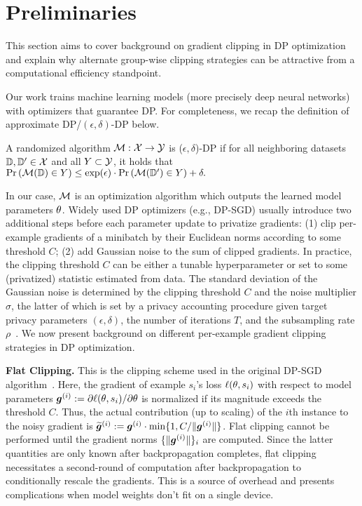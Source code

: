 \section{Preliminaries} \label{sec:preliminary}
This section aims to cover background on gradient clipping in DP optimization and explain why alternate group-wise clipping strategies can be attractive from a computational efficiency standpoint.

Our work trains machine learning models (more precisely deep neural networks) with optimizers that guarantee DP. 
For completeness, we recap the definition of approximate DP/$(\epsilon, \delta)$-DP below.
\begin{defi}
A randomized algorithm $\mathcal{M}: \mathcal{X} \to \mathcal{Y}$ is ($\epsilon, \delta$)-DP if for all neighboring datasets $\mathbb{D}, \mathbb{D}'\in \mathcal{X}$ and all $Y \subset \mathcal{Y}$, it holds that 
$
\mathrm{Pr}\left(\mathcal{M}(\mathbb{D}) \in Y\right) \le 
\exp( \epsilon ) \cdot \mathrm{Pr}\left( \mathcal{M}(\mathbb{D}') \in Y \right) + \delta.
\label{eq:epsilon_delta_dp}
$
\end{defi}
In our case, $\mathcal{M}$ is an optimization algorithm which outputs the learned model parameters $\mathbf{\theta}$. 
Widely used DP optimizers (e.g., DP-SGD) usually introduce two additional steps before each parameter update to privatize gradients:
(1) clip per-example gradients of a minibatch by their Euclidean norms according to some threshold $C$;
(2) add Gaussian noise to the sum of clipped gradients. 
In practice, the clipping threshold $C$ can be either a tunable hyperparameter or set to some (privatized) statistic estimated from data. 
The standard deviation of the Gaussian noise is determined by the clipping threshold $C$ and the noise multiplier $\sigma$, the latter of which is set by a privacy accounting procedure given target privacy parameters $(\epsilon, \delta)$, the number of iterations $T$, and the subsampling rate $\rho$~\citep{abadi2016deep,mironov2017renyi, dong2019gaussian, gopi2021numerical}. 
We now present background on different per-example gradient clipping strategies in DP optimization.

\textbf{Flat Clipping.}
This is the clipping scheme used in the original DP-SGD algorithm~\citep{abadi2016deep}.
Here, the gradient of example $s_i$'s loss $\ell(\mathbf{\theta}, s_i)$ with respect to model parameters $\bm{g}^{(i)}:= {\partial \ell(\mathbf{\theta}, s_i)} / {\partial \mathbf{\theta}}$ is normalized if its magnitude exceeds the threshold $C$.
Thus, the actual contribution (up to scaling) of the $i$th instance to the noisy gradient is
$\widetilde{\bm{g}}^{(i)} := \bm{g}^{(i)}\cdot \min \{1, C /  {\|\bm{g}^{(i)}\| } \}$.
Flat clipping cannot be performed until the gradient norms $\{\|\bm{g}^{(i)}\|\}_i$ are computed. 
Since the latter quantities are only known after backpropagation completes, flat clipping necessitates a second-round of computation after backpropagation to conditionally rescale the gradients. 
This is a source of overhead and presents complications when model weights don't fit on a single device. 



